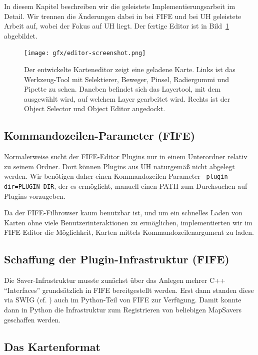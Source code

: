 In diesem Kapitel beschreiben wir die geleistete Implementierungsarbeit im
Detail. Wir trennen die Änderungen dabei in bei FIFE und bei UH geleistete
Arbeit auf, wobei der Fokus auf UH liegt. Der fertige Editor ist in
Bild~\ref{figure:editor} abgebildet.

%
%
\begin{figure}[htbp]
  \centering

    \texttt{[image: gfx/editor-screenshot.png]}

  \caption{Der entwickelte Karteneditor zeigt eine geladene Karte. Links
  ist das Werkzeug-Tool mit Selektierer, Beweger, Pinsel, Radiergummi und
  Pipette zu sehen. Daneben befindet sich das Layertool, mit dem ausgewählt
  wird, auf welchem Layer gearbeitet wird. Rechts ist der Object Selector und
  Object Editor angedockt.}
  \label{figure:editor}
\end{figure}

\subsection{Kommandozeilen-Parameter (FIFE)}
Normalerweise sucht der FIFE-Editor Plugins nur in einem Unterordner relativ zu
seinem Ordner. Dort können Plugins aus UH naturgemäß nicht abgelegt werden. Wir
benötigen daher einen Kommandozeilen-Parameter {\tt --plugin-dir=PLUGIN\_DIR},
der es ermöglicht, manuell einen PATH zum Durchsuchen auf Plugins vorzugeben. 

Da der FIFE-Filbrowser kaum benutzbar ist, und um ein schnelles Laden von Karten
ohne viele Benutzerinteraktionen zu ermöglichen, implementierten wir im FIFE
Editor die Möglichkeit, Karten mittels Kommandozeilenargument zu laden. 



\subsection{Schaffung der Plugin-Infrastruktur (FIFE)}
Die Saver-Infrastruktur musste zunächst über das Anlegen mehrer C++
``Interfaces'' grundsätzlich in FIFE bereitgestellt werden. Erst dann standen
diese via SWIG (cf.
\cite{swig}) auch im Python-Teil von FIFE zur Verfügung. Damit konnte dann in
Python die Infrastruktur zum Registrieren von beliebigen MapSavers geschaffen
werden.

\subsection{Das Kartenformat}
\label{kartenformat}

